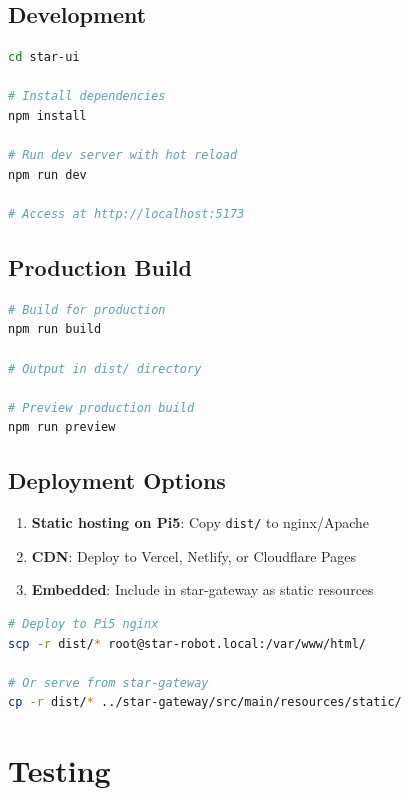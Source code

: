 \documentclass[11pt,letterpaper]{article}
\begin{document}
\subsection{Development}

\begin{lstlisting}[language=bash]
cd star-ui

# Install dependencies
npm install

# Run dev server with hot reload
npm run dev

# Access at http://localhost:5173
\end{lstlisting}

\subsection{Production Build}

\begin{lstlisting}[language=bash]
# Build for production
npm run build

# Output in dist/ directory

# Preview production build
npm run preview
\end{lstlisting}

\subsection{Deployment Options}

\begin{enumerate}
    \item \textbf{Static hosting on Pi5}: Copy \texttt{dist/} to nginx/Apache
    \item \textbf{CDN}: Deploy to Vercel, Netlify, or Cloudflare Pages
    \item \textbf{Embedded}: Include in star-gateway as static resources
\end{enumerate}

\begin{lstlisting}[language=bash]
# Deploy to Pi5 nginx
scp -r dist/* root@star-robot.local:/var/www/html/

# Or serve from star-gateway
cp -r dist/* ../star-gateway/src/main/resources/static/
\end{lstlisting}

\section{Testing}
\end{document}
